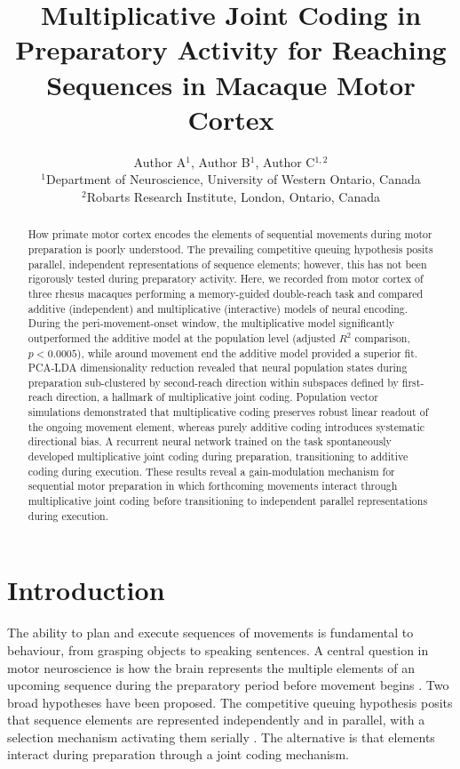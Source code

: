 \documentclass[11pt]{article}
\title{Multiplicative Joint Coding in Preparatory Activity for Reaching Sequences in Macaque Motor Cortex}
\author{Author A$^{1}$, Author B$^{1}$, Author C$^{1,2}$\\
\small $^{1}$Department of Neuroscience, University of Western Ontario, Canada\\
\small $^{2}$Robarts Research Institute, London, Ontario, Canada}
\date{}
\begin{document}
\maketitle

\begin{abstract}
How primate motor cortex encodes the elements of sequential movements during motor preparation is poorly understood. The prevailing competitive queuing hypothesis posits parallel, independent representations of sequence elements; however, this has not been rigorously tested during preparatory activity. Here, we recorded from motor cortex of three rhesus macaques performing a memory-guided double-reach task and compared additive (independent) and multiplicative (interactive) models of neural encoding. During the peri-movement-onset window, the multiplicative model significantly outperformed the additive model at the population level (adjusted $R^2$ comparison, $p < 0.0005$), while around movement end the additive model provided a superior fit. PCA-LDA dimensionality reduction revealed that neural population states during preparation sub-clustered by second-reach direction within subspaces defined by first-reach direction, a hallmark of multiplicative joint coding. Population vector simulations demonstrated that multiplicative coding preserves robust linear readout of the ongoing movement element, whereas purely additive coding introduces systematic directional bias. A recurrent neural network trained on the task spontaneously developed multiplicative joint coding during preparation, transitioning to additive coding during execution. These results reveal a gain-modulation mechanism for sequential motor preparation in which forthcoming movements interact through multiplicative joint coding before transitioning to independent parallel representations during execution.
\end{abstract}

\section{Introduction}

The ability to plan and execute sequences of movements is fundamental to behaviour, from grasping objects to speaking sentences. A central question in motor neuroscience is how the brain represents the multiple elements of an upcoming sequence during the preparatory period before movement begins \citep{tanji2001sequential, lashley1951problem}. Two broad hypotheses have been proposed. The competitive queuing hypothesis posits that sequence elements are represented independently and in parallel, with a selection mechanism activating them serially \citep{bullock2004neural, averbeck2002parallel}. The alternative is that elements interact during preparation through a joint coding mechanism.
\end{document}
